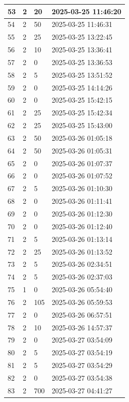 \begin{longtable}{|l|l|l|l|}
53 & 2 & 20 & 2025-03-25 11:46:20 \\ \hline 
54 & 2 & 50 & 2025-03-25 11:46:31 \\ \hline 
55 & 2 & 25 & 2025-03-25 13:22:45 \\ \hline 
56 & 2 & 10 & 2025-03-25 13:36:41 \\ \hline 
57 & 2 & 0 & 2025-03-25 13:36:53 \\ \hline 
58 & 2 & 5 & 2025-03-25 13:51:52 \\ \hline 
59 & 2 & 0 & 2025-03-25 14:14:26 \\ \hline 
60 & 2 & 0 & 2025-03-25 15:42:15 \\ \hline 
61 & 2 & 25 & 2025-03-25 15:42:34 \\ \hline 
62 & 2 & 25 & 2025-03-25 15:43:00 \\ \hline 
63 & 2 & 50 & 2025-03-26 01:05:18 \\ \hline 
64 & 2 & 50 & 2025-03-26 01:05:31 \\ \hline 
65 & 2 & 0 & 2025-03-26 01:07:37 \\ \hline 
66 & 2 & 0 & 2025-03-26 01:07:52 \\ \hline 
67 & 2 & 5 & 2025-03-26 01:10:30 \\ \hline 
68 & 2 & 0 & 2025-03-26 01:11:41 \\ \hline 
69 & 2 & 0 & 2025-03-26 01:12:30 \\ \hline 
70 & 2 & 0 & 2025-03-26 01:12:40 \\ \hline 
71 & 2 & 5 & 2025-03-26 01:13:14 \\ \hline 
72 & 2 & 25 & 2025-03-26 01:13:52 \\ \hline 
73 & 2 & 5 & 2025-03-26 02:34:51 \\ \hline 
74 & 2 & 5 & 2025-03-26 02:37:03 \\ \hline 
75 & 1 & 0 & 2025-03-26 05:54:40 \\ \hline 
76 & 2 & 105 & 2025-03-26 05:59:53 \\ \hline 
77 & 2 & 0 & 2025-03-26 06:57:51 \\ \hline 
78 & 2 & 10 & 2025-03-26 14:57:37 \\ \hline 
79 & 2 & 0 & 2025-03-27 03:54:09 \\ \hline 
80 & 2 & 5 & 2025-03-27 03:54:19 \\ \hline 
81 & 2 & 5 & 2025-03-27 03:54:29 \\ \hline 
82 & 2 & 0 & 2025-03-27 03:54:38 \\ \hline 
83 & 2 & 700 & 2025-03-27 04:41:27 \\ \hline 

\end{longtable}
